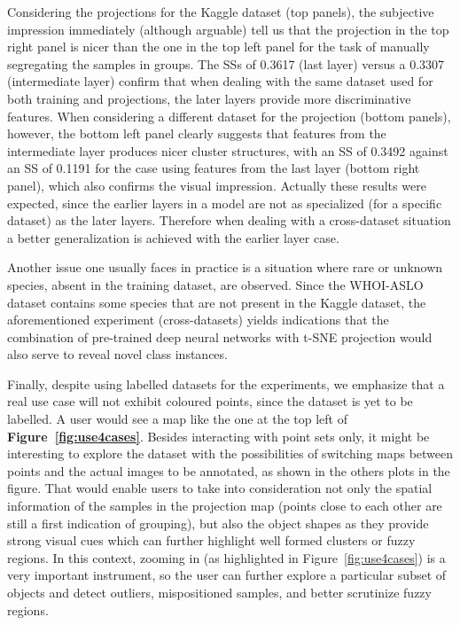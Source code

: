 \documentclass[sn-basic]{sn-jnl}%
\theoremstyle{thmstyleone}%
\theoremstyle{thmstyletwo}%
\theoremstyle{thmstylethree}%
\begin{document}
Considering the projections for the Kaggle dataset (top panels), the subjective impression immediately (although arguable) tell us that the projection in the top right panel is nicer than the one in the top left panel for the task of manually segregating the samples in groups. The SSs of 0.3617 (last layer) versus a 0.3307 (intermediate layer) confirm that when dealing with the same dataset used for both training and projections, the later layers provide more discriminative features. When considering a different dataset for the projection (bottom panels), however, the bottom left panel clearly suggests that features from the intermediate layer produces nicer cluster structures, with an SS of 0.3492 against an SS of 0.1191 for the case using features from the last layer (bottom right panel), which also confirms the visual impression. Actually these results were expected, since the earlier layers in a model are not as specialized (for a specific dataset) as the later layers. Therefore when dealing with a cross-dataset situation a better generalization is achieved with the earlier layer case.

Another issue one usually faces in practice is a situation where rare or unknown species, absent in the training dataset, are observed. Since the WHOI-ASLO dataset contains some species that are not present in the Kaggle dataset, the aforementioned experiment (cross-datasets) yields indications that the combination of pre-trained deep neural networks with t-SNE projection would also serve to reveal novel class instances. %

Finally, despite using labelled datasets for the experiments, we emphasize that a real use case will not exhibit coloured points, since the dataset is yet to be labelled. A user would see a map like the one at the top left of {\bf Figure~\ref{fig:use4cases}}. Besides interacting with point sets only, it might be interesting to explore the dataset with the possibilities of switching maps between points and the actual images to be annotated, as shown in the others plots in the figure. That would enable users to take into consideration not only the spatial information of the samples in the projection map (points close to each other are still a first indication of grouping), but also the object shapes as they provide strong visual cues which can further highlight well formed clusters or fuzzy regions. In this context, zooming in (as highlighted in Figure~\ref{fig:use4cases}) is a very important instrument, so the user can further explore a particular subset of objects and detect outliers, mispositioned samples, and better scrutinize fuzzy regions.
\end{document}
